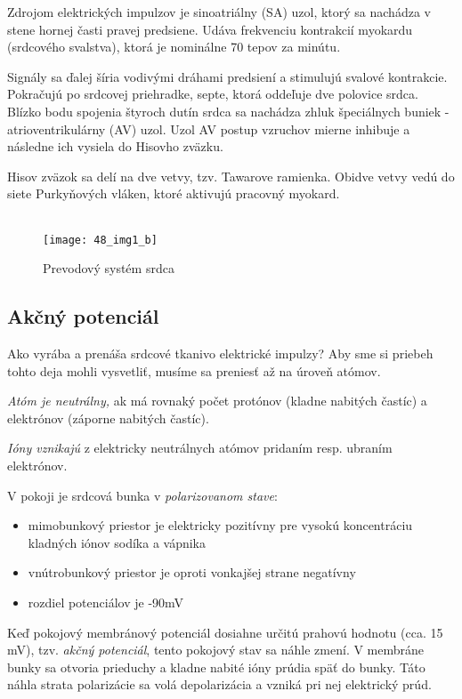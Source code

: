\documentclass[titlepage]{article}
\begin{document}
Zdrojom elektrických impulzov je sinoatriálny (SA) uzol, ktorý sa nachádza v stene hornej časti pravej predsiene. Udáva frekvenciu kontrakcií myokardu (srdcového svalstva), ktorá je nominálne 70 tepov za minútu.

Signály sa ďalej šíria vodivými dráhami predsiení a stimulujú svalové kontrakcie. Pokračujú po srdcovej priehradke, septe, ktorá oddeľuje dve polovice srdca. Blízko bodu spojenia štyroch dutín srdca sa nachádza zhluk špeciálnych buniek - atrioventrikulárny (AV) uzol. Uzol AV postup vzruchov mierne inhibuje a následne ich vysiela do Hisovho zväzku.

Hisov zväzok  sa delí na dve vetvy, tzv. Tawarove ramienka. Obidve vetvy vedú do siete Purkyňových vláken, ktoré aktivujú pracovný myokard.
\\
\\

\begin{figure}[!ht]
\begin{center}
\texttt{[image: 48\_img1\_b]}
\caption{Prevodový systém srdca}
\end{center}
\end{figure}

\newpage
\subsection{Akčný potenciál}
Ako vyrába a prenáša srdcové tkanivo elektrické impulzy? Aby sme si priebeh tohto deja mohli vysvetliť, musíme sa preniesť až na úroveň atómov.

\emph{Atóm je neutrálny,} ak má rovnaký počet protónov (kladne nabitých častíc) a elektrónov (záporne nabitých častíc). 

\emph{Ióny vznikajú} z elektricky neutrálnych atómov pridaním resp. ubraním elektrónov. 

V pokoji je srdcová bunka v \emph{polarizovanom stave}:
\begin{itemize}
	\item mimobunkový priestor je elektricky pozitívny pre vysokú koncentráciu kladných iónov sodíka a vápnika
	\item vnútrobunkový priestor je oproti vonkajšej strane negatívny
	\item rozdiel potenciálov je -90mV
\end{itemize}

Keď pokojový membránový potenciál dosiahne určitú prahovú hodnotu (cca. 15 mV), tzv. \emph{akčný potenciál}, tento pokojový stav sa náhle zmení. V membráne bunky sa otvoria prieduchy a kladne nabité ióny prúdia späť do bunky. Táto náhla strata polarizácie sa volá depolarizácia a vzniká pri nej elektrický prúd.
\end{document}
